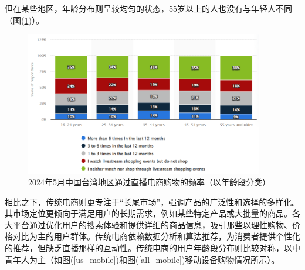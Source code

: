 \documentclass[12pt]{ctexart}
\begin{document}
但在某些地区，年龄分布则呈较均匀的状态，55岁以上的人也没有与年轻人不同（图(\ref{interest_tw})）。

\begin{figure}[htbp!]
    \centering
    \includegraphics[width=0.93\textwidth]{Images/13.png}
    \caption{2024年5月中国台湾地区通过直播电商购物的频率（以年龄段分类）\cite{17}}
    \label{interest_tw}
\end{figure}

相比之下，传统电商则更专注于“长尾市场”，强调产品的广泛性和选择的多样化。其市场定位更倾向于满足用户的长期需求，例如某些特定产品或大批量的商品。各大平台通过优化用户的搜索体验和提供详细的商品信息，吸引那些以理性购物、价格对比为主的用户群体。传统电商依赖数据分析和算法推荐，为消费者提供个性化的推荐，但缺乏直播那样的互动性。传统电商的用户年龄段分布则比较对称，以中青年人为主（如图(\ref{us_mobile})和图(\ref{all_mobile})移动设备购物情况所示）。
\end{document}
